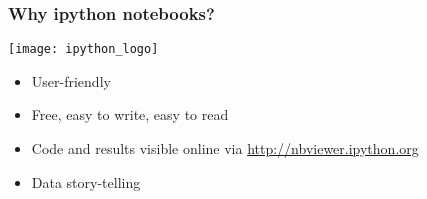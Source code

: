 
\begin{frame}[c]
\footnotesize
\frametitle{Why ipython notebooks?}

\texttt{[image: ipython\_logo]}

\vspace{1cm}

\begin{itemize}
\item User-friendly
\item Free, easy to write, easy to read
\item Code and results visible online via \url{http://nbviewer.ipython.org}
\item<2-> Data story-telling
\end{itemize}

\end{frame}


